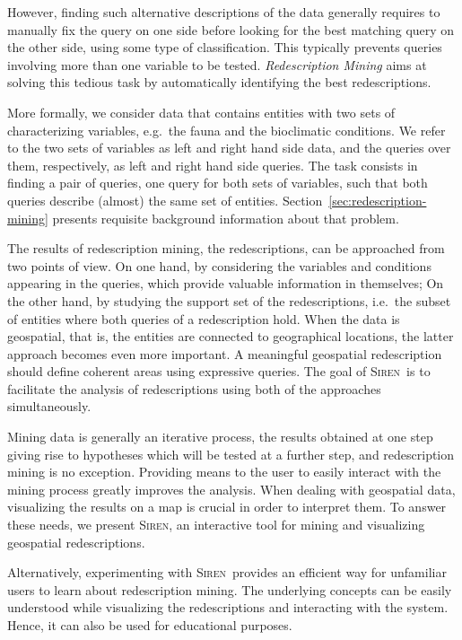\documentclass{llncs}
\newcommand{\Siren}{\textsc{Siren}}
\begin{document}
However, finding such alternative descriptions of the data
generally requires to manually fix the query on one side before
looking for the best matching query on the other side, using some type
of classification. This typically prevents queries involving more than
one variable to be tested. \emph{Redescription Mining} aims at
solving this tedious task by automatically identifying the best
redescriptions.

More formally, we consider data that contains entities with two sets
of characterizing variables, e.g.\ the fauna and the bioclimatic
conditions. We refer to the two sets of variables as left and right
hand side data, and the queries over them, respectively, as left and
right hand side queries.  The task consists in finding a pair of
queries, one query for both sets of variables, such that both queries
describe (almost) the same set of entities.
Section~\ref{sec:redescription-mining} presents requisite
background information about that problem.

The results of redescription mining, the redescriptions, can be
approached from two points of view. On one hand, by considering the
variables and conditions appearing in the queries, which provide
valuable information in themselves; On the other hand, by studying the
support set of the redescriptions, i.e.\ the subset of entities where
both queries of a redescription hold. When the data is geospatial,
that is, the entities are connected to geographical locations, the
latter approach becomes even more important. A meaningful geospatial
redescription should define coherent areas using expressive
queries. The goal of \Siren\ is to facilitate the analysis of
redescriptions using both of the approaches simultaneously.

Mining data is generally an iterative process, the results obtained at
one step giving rise to hypotheses which will be tested at a further
step, and redescription mining is no exception. Providing means to the
user to easily interact with the mining process greatly improves the
analysis.  When dealing with geospatial data, visualizing the results
on a map is crucial in order to interpret them.  To answer
these needs, we present \Siren, an interactive tool for mining and
visualizing geospatial redescriptions.  

Alternatively, experimenting with \Siren\ provides an efficient way
for unfamiliar users to learn about redescription mining. The
underlying concepts can be easily understood while visualizing the
redescriptions and interacting with the system. Hence, it can also be
used for educational purposes.
\end{document}
